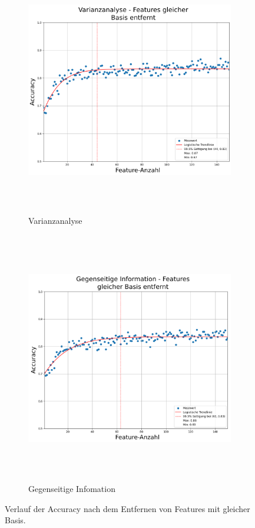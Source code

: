 \begin{figure}[hp]
     \centering
     \begin{subfigure}[b]{0.9\textwidth}
         \centering
         \includegraphics[width=\textwidth, height=11cm]{img/Plots/Feature Auswahl/Filter-Methoden ANOVA mit Entfernen.png}
         \caption{Varianzanalyse}
     \end{subfigure}
     \hfill
     \begin{subfigure}[b]{0.9\textwidth}
         \centering
         \includegraphics[width=\textwidth, height=11cm]{img/Plots/Feature Auswahl/Filter-Methoden Mutual Info mit Entfernen.png}
         \caption{Gegenseitige Infomation}
     \end{subfigure}
     \caption{Verlauf der Accuracy nach dem Entfernen von Features mit gleicher Basis.}
     \label{fig:plotRIPsame Bais}
\end{figure}

